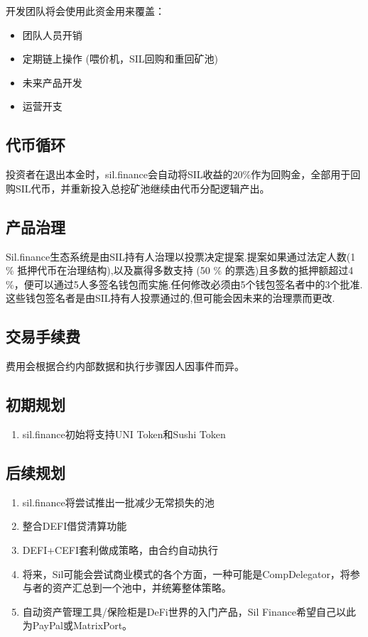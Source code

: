 \documentclass[11pt,letterpaper]{article}
\begin{document}
\begin{multicols}{2}
开发团队将会使用此资金用来覆盖：
\begin{itemize}
    \item 团队人员开销
    \item 定期链上操作 (喂价机，SIL回购和重回矿池)
    \item 未来产品开发
    \item 运营开支
\end{itemize}

\subsection{代币循环}
投资者在退出本金时，sil.finance会自动将SIL收益的20\%作为回购金，全部用于回购SIL代币，并重新投入总挖矿池继续由代币分配逻辑产出。

\subsection{产品治理}
Sil.finance生态系统是由SIL持有人治理以投票决定提案.提案如果通过法定人数(1 \% 抵押代币在治理结构),以及赢得多数支持 (50 \% 的票选)且多数的抵押额超过4 \%，便可以通过5人多签名钱包而实施.任何修改必须由5个钱包签名者中的3个批准.这些钱包签名者是由SIL持有人投票通过的,但可能会因未来的治理票而更改.

\subsection{交易手续费}
费用会根据合约内部数据和执行步骤因人因事件而异。

\subsection{初期规划}
\begin{enumerate}
  \item sil.finance初始将支持UNI Token和Sushi Token
\end{enumerate}

\subsection{后续规划}
\begin{enumerate}
  \item sil.finance将尝试推出一批减少无常损失的池
  \item 整合DEFI借贷清算功能
  \item DEFI+CEFI套利做成策略，由合约自动执行
  \item 将来，Sil可能会尝试商业模式的各个方面，一种可能是CompDelegator，将参与者的资产汇总到一个池中，并统筹整体策略。
  \item 自动资产管理工具/保险柜是DeFi世界的入门产品，Sil Finance希望自己以此为PayPal或MatrixPort。
\end{enumerate}


\end{multicols}
\end{document}

